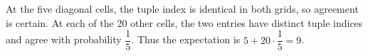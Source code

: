 At the five diagonal cells, the tuple index is identical in both grids, so agreement is certain. At each of the 20 other cells, the two entries have distinct tuple indices and agree with probability $\dfrac{1}{5}$. Thus the expectation is $5+20\cdot\dfrac{1}{5}=\boxed9$.

